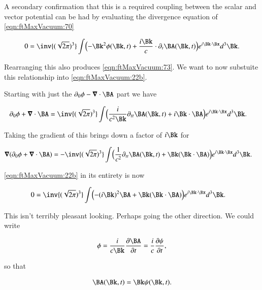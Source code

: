A secondary confirmation that this is a required coupling between the scalar and vector potential can be had by evaluating the divergence equation of \autoref{eqn:ftMaxVacuum:70}

\begin{align}\label{eqn:ftMaxVacuum:72b}
0 = 
\inv{(\sqrt{2 \pi})^3} \int 
\Bigl(
- \Bk^2 \phi(\Bk, t) + \frac{i\Bk}{c} \cdot \partial_t \BA(\Bk, t)
\Bigr)
e^{i \Bk \cdot \Bx } d^3 \Bk.
\end{align}

Rearranging this also produces \autoref{eqn:ftMaxVacuum:73}.  We want to now substuite this relationship into \autoref{eqn:ftMaxVacuum:22b}.

Starting with just the $\partial_0 \phi - \spacegrad \cdot \BA$ part we have

\begin{align}\label{eqn:ftMaxVacuum:74}
\partial_0 \phi + \spacegrad \cdot \BA
&=
\inv{(\sqrt{2 \pi})^3} \int 
\Bigl(
\frac{i}{c^2 \Bk} \partial_{tt} \BA(\Bk, t) + i \Bk \cdot \BA
\Bigr)
e^{i \Bk \cdot \Bx } d^3 \Bk.
\end{align}

Taking the gradient of this brings down a factor of $i\Bk$ for

\begin{align}\label{eqn:ftMaxVacuum:74b}
\spacegrad (\partial_0 \phi + \spacegrad \cdot \BA)
&=
-\inv{(\sqrt{2 \pi})^3} \int 
\Bigl(
\frac{1}{c^2} \partial_{tt} \BA(\Bk, t) + \Bk (\Bk \cdot \BA)
\Bigr)
e^{i \Bk \cdot \Bx } d^3 \Bk.
\end{align}

\autoref{eqn:ftMaxVacuum:22b} in its entirety is now

\begin{align}\label{eqn:ftMaxVacuum:75}
0 &=
\inv{(\sqrt{2 \pi})^3} \int 
\Bigl(
- (i\Bk)^2 \BA
+ \Bk (\Bk \cdot \BA)
\Bigr)
e^{i \Bk \cdot \Bx } d^3 \Bk.
\end{align}

This isn't terribly pleasant looking.  Perhaps going the other direction.  We could write

\begin{align}\label{eqn:ftMaxVacuum:76}
\phi = \frac{i}{c \Bk} \PD{t}{\BA} = \frac{i}{c} \PD{t}{\psi},
\end{align}

so that

\begin{align}\label{eqn:ftMaxVacuum:77}
\BA(\Bk, t) = \Bk \psi(\Bk, t).
\end{align}

